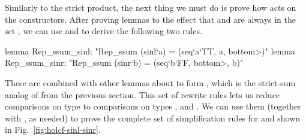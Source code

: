 Similarly to the strict product, the next thing we must do is prove how  acts on the constructors. After proving lemmas to the effect that  and  are always in the set , we can use  and  to derive the following two rules.

\begin{isacodes}
lemma Rep_ssum_sinl: "Rep_ssum (sinl`a) = (seq`a`TT, a, \<bottom>)"
lemma Rep_ssum_sinr: "Rep_ssum (sinr`b) = (seq`b`FF, \<bottom>, b)"
\end{isacodes}

\noindent
These are combined with other lemmas about  to form , which is the strict-sum analog of  from the previous section. This set of rewrite rules lets us reduce comparisons on type  to comparisons on types ,  and . We can use them (together with , as needed) to prove the complete set of simplification rules for  and  shown in Fig.~\ref{fig:holcf-sinl-sinr}.

